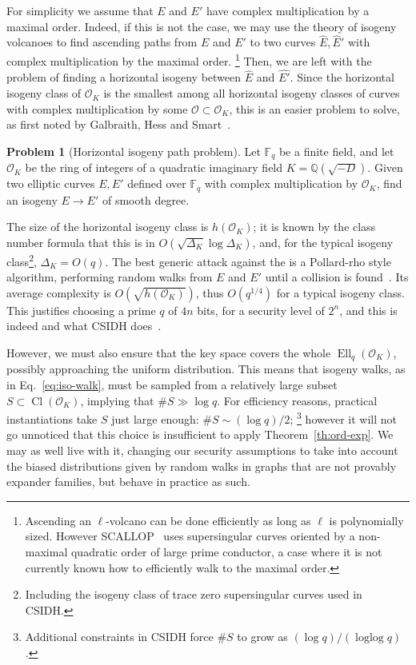\documentclass[10pt]{article}
\theoremstyle{plain}
\theoremstyle{definition}
\newtheorem{problem}{Problem}
\DeclareMathOperator{\loglog}{loglog}
\DeclareMathOperator{\Cl}{Cl}
\DeclareMathOperator{\Ell}{Ell}
\def\F{\ensuremath{\mathbb{F}}}
\def\O{\ensuremath{\mathcal{O}}}
\begin{document}
For simplicity we assume that $E$ and $E'$ have complex multiplication
by a maximal order. %
Indeed, if this is not the case, we may use the theory of isogeny
volcanoes to find ascending paths from $E$ and $E'$ to two curves
$\hat{E},\hat{E}'$ with complex multiplication by the maximal order.%
\footnote{Ascending an $\ell$-volcano can be done efficiently as long
  as $\ell$ is polynomially sized. %
  However SCALLOP~\cite{PKC:DFKLMPW23} uses supersingular curves
  oriented by a non-maximal quadratic order of large prime conductor,
  a case where it is not currently known how to efficiently walk to
  the maximal order.} %
Then, we are left with the problem of finding a horizontal isogeny
between $\hat{E}$ and $\hat{E'}$. %
Since the horizontal isogeny class of $\O_K$ is the smallest among all
horizontal isogeny classes of curves with complex multiplication by
some $\O⊂\O_K$, this is an easier problem to solve, as first noted by
Galbraith, Hess and
Smart~\cite{EC:GalHesSma02,galbraith+stolbunov11}.%

\begin{problem}[Horizontal isogeny path problem]
  \label{prob:hiwp}
  Let $\F_q$ be a finite field, and let $\O_K$ be the ring of integers
  of a quadratic imaginary field $K=ℚ(\sqrt{-D})$. %
  Given two elliptic curves $E,E'$ defined over $\F_q$ with complex
  multiplication by $\O_K$, find an isogeny $E→E'$ of smooth degree.
\end{problem}

The size of the horizontal isogeny class is $h(\O_K)$; it is known by
the class number formula that this is in $O(\sqrt{Δ_K}\log Δ_K)$, and,
for the typical isogeny class\footnote{Including the isogeny class of
  trace zero supersingular curves used in CSIDH.}, $Δ_K=O(q)$. %
The best generic attack against the  is a
Pollard-rho style algorithm, performing random walks from $E$ and $E'$
until a collision is found~\cite{GHS}. %
Its average complexity is $O(\sqrt{h(\O_K)})$, thus $O(q^{1/4})$ for a
typical isogeny class. %
This justifies choosing a prime $q$ of $4n$ bits, for a security level
of $2^n$, and this is indeed and what CSIDH
does~\cite{AC:CLMPR18}.

However, we must also ensure that the key space covers the whole
$\Ell_q(\O_K)$, possibly approaching the uniform distribution. %
This means that isogeny walks, as in Eq.~\eqref{eq:iso-walk}, must be
sampled from a relatively large subset $S⊂\Cl(\O_K)$, implying that
$\#S\gg \log q$. %
For efficiency reasons, practical instantiations take $S$ just large
enough: $\#S\sim (\log q)/2$;%
\footnote{Additional constraints in CSIDH force $\#S$ to grow as
  $(\log q)/(\loglog q)$.} %
however it will not go unnoticed that this choice is insufficient to
apply Theorem~\ref{th:ord-exp}. %
We may as well live with it, changing our security assumptions to take
into account the biased distributions given by random walks in graphs
that are not provably expander families, but behave in practice as
such. %
\end{document}
